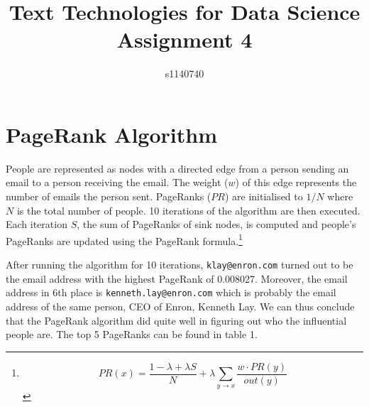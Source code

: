 \documentclass{tufte-handout}
\title{Text Technologies for Data Science Assignment 4}
\author{s1140740}
\begin{document}
\maketitle

\bigskip


\section{PageRank Algorithm}\label{pagerank-algorithm}

People are represented as nodes with a directed edge from a person
sending an email to a person receiving the email. The weight ($w$) of
this edge represents the number of emails the person sent. PageRanks
($PR$) are initialised to $1/N$ where $N$ is the total number of people.
10 iterations of the algorithm are then executed. Each iteration $S$,
the sum of PageRanks of sink nodes, is computed and people's PageRanks
are updated using the PageRank formula.\footnote{\[PR(x) = \frac{1-\lambda+\lambda S}{N} + \lambda \sum_{y \rightarrow x} \frac{w \cdot PR(y)}{out(y)} \]}

After running the algorithm for 10 iterations, \texttt{klay@enron.com}
turned out to be the email address with the highest PageRank of
0.008027. Moreover, the email address in 6th place is
\texttt{kenneth.lay@enron.com} which is probably the email address of
the same person, CEO of Enron, Kenneth Lay. We can thus conclude that
the PageRank algorithm did quite well in figuring out who the
influential people are. The top 5 PageRanks can be found in table 1.
\end{document}

